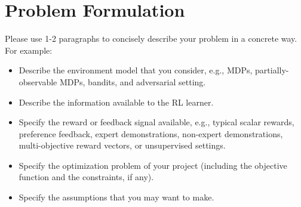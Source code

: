 \section{Problem Formulation}
Please use 1-2 paragraphs to concisely describe your problem in a concrete way. For example:
\begin{itemize}
    \item Describe the environment model that you consider, e.g., MDPs, partially-observable MDPs, bandits, and adversarial setting.
    \item Describe the information available to the RL learner.
    \item Specify the reward or feedback signal available, e.g., typical scalar rewards, preference feedback, expert demonstrations, non-expert demonstrations, multi-objective reward vectors, or unsupervised settings.
    \item Specify the optimization problem of your project (including the objective function and the constraints, if any).
    \item Specify the assumptions that you may want to make.
\end{itemize}